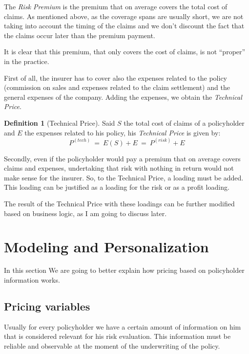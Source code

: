 \documentclass[a4paper, nobind]{templates/ociamthesis}
\theoremstyle{definition}
\newtheorem{definition}{Definition}[chapter]
\theoremstyle{definition}
\theoremstyle{definition}
\theoremstyle{remark}
\begin{document}
The \emph{Risk Premium} is the premium that on average covers the total cost of claims. As mentioned above, as the coverage spans are usually short, we are not taking into account the timing of the claims and we don't discount the fact that the claims occur later than the premium payment.

It is clear that this premium, that only covers the cost of claims, is not ``proper'' in the practice.

First of all, the insurer has to cover also the expenses related to the policy (commission on sales and expenses related to the claim settlement) and the general expenses of the company. Adding the expenses, we obtain the \emph{Technical Price}.

\begin{definition}[Technical Price]
\label{def:technical-price} \iffalse (Technical Price) \fi{} Said \(S\) the total cost of claims of a policyholder and \(E\) the expenses related to his policy, his \emph{Technical Price} is given by:
\[
P^{(tech)} \ = \ E(S) + E \ = \ P^{(risk)} + E
\]
\end{definition}

Secondly, even if the policyholder would pay a premium that on average covers claims and expenses, undertaking that risk with nothing in return would not make sense for the insurer. So, to the Technical Price, a loading must be added. This loading can be justified as a loading for the risk or as a profit loading.

The result of the Technical Price with these loadings can be further modified based on business logic, as I am going to discuss later.

\hypertarget{chap:personalization}{%
\section{Modeling and Personalization}\label{chap:personalization}}

In this section We are going to better explain how pricing based on policyholder information works.

\hypertarget{pricing-variables}{%
\subsection{Pricing variables}\label{pricing-variables}}

Usually for every policyholder we have a certain amount of information on him that is considered relevant for his risk evaluation. This information must be reliable and observable at the moment of the underwriting of the policy.
\end{document}
